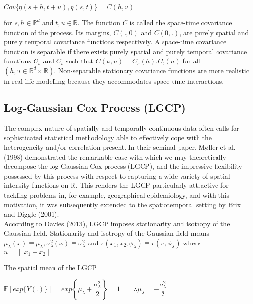 \documentclass[a4paper]{thesis}
\begin{document}
\begin{center}
$Cov \lbrace \eta(s+h,t+u), \eta(s,t)\rbrace = C(h,u)$
\end{center}

for $s,h \in \mathbb{R}^d$ and $t,u \in \mathbb{R}$. The function $C$ is called the space-time covariance function of the process. Its margins, $C(.,0)$ and $C(0,.)$, are purely spatial and purely temporal covariance functions respectively. A space-time covariance function is separable if there exists purely spatial and purely temporal covariance functions $C_s$ and $C_t$ such that $C(h,u) = C_s(h) . C_t(u)$ for all $(h,u \in \mathbb{R}^d \times \mathbb{R})$. Non-separable stationary covariance functions are more realistic in real life modelling because they accommodates space-time interactions.

\subsection{Log-Gaussian Cox Process (LGCP)}

The complex nature of spatially and temporally continuous data often calls for sophisticated statistical methodology able to effectively cope with the heterogeneity and/or correlation present. In their seminal paper, Møller et al. (1998) demonstrated the remarkable ease with which we may theoretically decompose the log-Gaussian Cox process (LGCP), and the impressive flexibility possessed by this process with respect to capturing a wide variety of spatial intensity functions on R. This renders
the LGCP particularly attractive for tackling problems in, for example, geographical epidemiology, and with this motivation, it was subsequently extended to the spatiotemporal setting by Brix and Diggle (2001).\\

According to Davies (2013), LGCP imposes stationarity and isotropy of the Gaussian field. \cite{Davies2013} Stationarity and isotropy of the Gaussian field means $\mu_{\lambda} (x) \equiv \mu_{\lambda}, \sigma^2_{\lambda} (x) \equiv \sigma^2_{\lambda} $ and $r(x_1,x_2;\phi_{\lambda})\equiv r(u;\phi_{\lambda})$ where $u = \parallel x_1 - x_2 \parallel$

The spatial mean of the LGCP 

\begin{center}

$\mathbb{E} \left[ exp \lbrace Y(.)\rbrace \right] = exp\left\lbrace \mu_{\lambda} + \dfrac{\sigma^2_{\lambda}}{2}\right\rbrace = 1 \quad \quad \therefore \mu_{\lambda} = - \dfrac{\sigma^2_{\lambda}}{2}$

\end{center}
\end{document}
